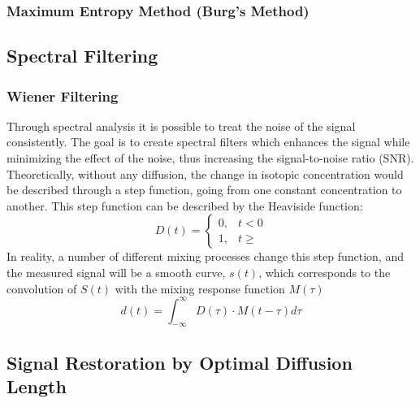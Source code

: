 \documentclass[../../CompleteThesis/Complete_1stDraft]{subfiles}
\begin{document}
\subsubsection[MEM][MEM]{Maximum Entropy Method (Burg's Method)}
\label{Subsubsec:SignalAnalysis_BackDiffusion_SpectralAnalysis_MEM}

\subsection[Spectral Filtering][Spectral Filtering]{Spectral Filtering}
\label{Subsec:SignalAnalysis_BackDiffusion_SpectralFiltering}
\subsubsection[Wiener Filtering][Wiener Filtering]{Wiener Filtering}
\label{Subsubsec:SignalAnalysis_BackDiffusion_SpectralFiltering_Wiener}
Through spectral analysis it is possible to treat the noise of the signal consistently. The goal is to create spectral filters which enhances the signal while minimizing the effect of the noise, thus increasing the signal-to-noise ratio (SNR).\\
Theoretically, without any diffusion, the change in isotopic concentration would be described through a step function, going from one constant concentration to another. This step function can be described by the Heaviside function:
\begin{equation}
	D(t) = \begin{cases}
		0, & t < 0 \\
		1, & t \geq
	\end{cases}
\end{equation}
In reality, a number of different mixing processes change this step function, and the measured signal will be a smooth curve, $s(t)$, which corresponds to the convolution of $S(t)$ with the mixing response function $M(\tau)$
\begin{equation}
	d(t) = \int_{- \infty}^{\infty} D(\tau) \cdot M(t - \tau)d\tau
\end{equation}


\subsection[Signal Restoration][Signal Restoration]{Signal Restoration by Optimal Diffusion Length}
\label{Subsec:SignalAnalysis_BackDiffusion_SignalRestoration}
\end{document}
